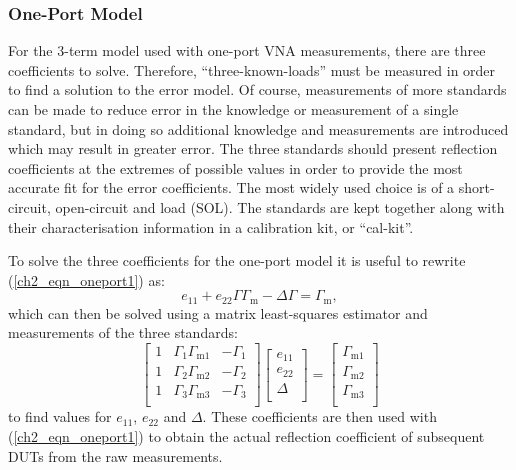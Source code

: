 \documentclass[../thesis/thesis.tex]{subfiles}
\begin{document}
\begin{refsection}
\subsubsection{One-Port Model}

For the 3-term model used with one-port VNA measurements, there are three coefficients to solve. Therefore, ``three-known-loads'' must be measured in order to find a solution to the error model. Of course, measurements of more standards can be made to reduce error in the knowledge or measurement of a single standard, but in doing so additional knowledge and measurements are introduced which may result in greater error. The three standards should present reflection coefficients at the extremes of possible values in order to provide the most accurate fit for the error coefficients. The most widely used choice is of a short-circuit, open-circuit and load (SOL). The standards are kept together along with their characterisation information in a calibration kit, or ``cal-kit''.

To solve the three coefficients for the one-port model it is useful to rewrite (\ref{ch2_eqn_oneport1}) as: 
\begin{equation}
	e_{11}+e_{22}\Gamma\Gamma_{\textrm{m}}-\Delta\Gamma = \Gamma_{\textrm{m}},
\end{equation}
which can then be solved using a matrix least-squares estimator and measurements of the three standards:
\begin{equation}
	\begin{bmatrix}
		1 & \Gamma_1\Gamma_{\textrm{m}1} & -\Gamma_1 \\
		1 & \Gamma_2\Gamma_{\textrm{m}2} & -\Gamma_2 \\
		1 & \Gamma_3\Gamma_{\textrm{m}3} & -\Gamma_3 \\
	\end{bmatrix}
	\begin{bmatrix}
		e_{11} \\
		e_{22} \\
		\Delta \\
	\end{bmatrix}
	=
	\begin{bmatrix}
		\Gamma_{\textrm{m}1} \\
		\Gamma_{\textrm{m}2} \\
		\Gamma_{\textrm{m}3} \\
	\end{bmatrix}
\end{equation}
to find values for $e_{11}$, $e_{22}$ and $\Delta$. These coefficients are then used with (\ref{ch2_eqn_oneport1}) to obtain the actual reflection coefficient of subsequent DUTs from the raw measurements.


\end{refsection}
\end{document}
